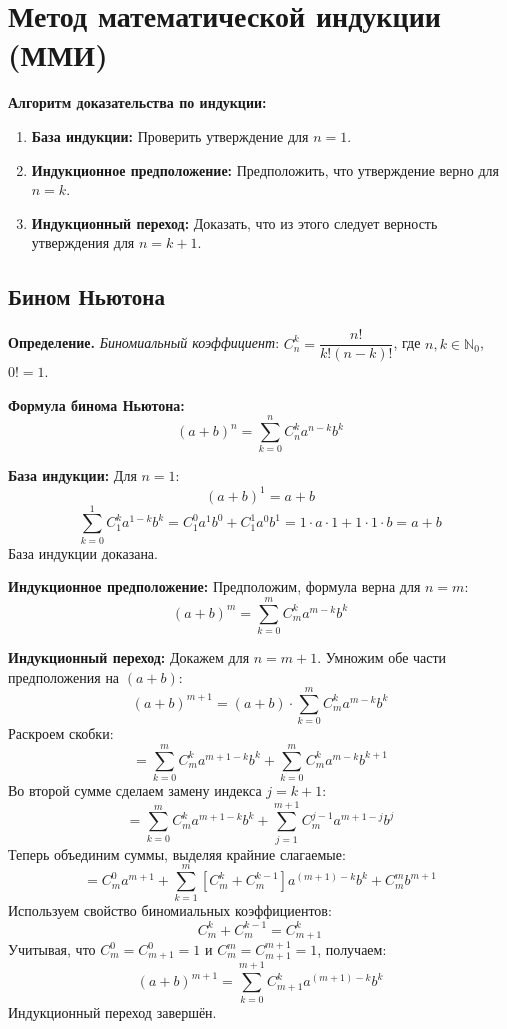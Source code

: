 \documentclass[12pt, a4paper]{article}
\begin{document}
\section{Метод математической индукции (ММИ)}
\begin{tcolorbox}
\textbf{Алгоритм доказательства по индукции:}
\begin{enumerate}
    \item \textbf{База индукции:} Проверить утверждение для $n = 1$.
    \item \textbf{Индукционное предположение:} Предположить, что утверждение верно для $n = k$.
    \item \textbf{Индукционный переход:} Доказать, что из этого следует верность утверждения для $n = k+1$.
\end{enumerate}
\end{tcolorbox}

\subsection{Бином Ньютона}
\begin{tcolorbox}
\textbf{Определение.} \textit{Биномиальный коэффициент}:
$C_n^k = \dfrac{n!}{k!(n-k)!}$, где $n,k \in \mathbb{N}_0$, $0! = 1$.
\end{tcolorbox}

\begin{tcolorbox}
\textbf{Формула бинома Ньютона:}
$$(a+b)^n = \sum_{k=0}^{n} C_n^k a^{n-k}b^k$$
\end{tcolorbox}

\begin{tcolorbox}[title=Доказательство по ММИ, breakable]
\textbf{База индукции:} Для $n=1$:
$$(a+b)^1 = a + b$$
$$\sum_{k=0}^{1} C_1^k a^{1-k}b^k = C_1^0 a^1 b^0 + C_1^1 a^0 b^1 = 1 \cdot a \cdot 1 + 1 \cdot 1 \cdot b = a + b$$
База индукции доказана.

\textbf{Индукционное предположение:} Предположим, формула верна для $n = m$:
$$(a+b)^m = \sum_{k=0}^{m} C_m^k a^{m-k}b^k$$

\textbf{Индукционный переход:} Докажем для $n = m+1$.
Умножим обе части предположения на $(a+b)$:
$$(a+b)^{m+1} = (a+b) \cdot \sum_{k=0}^{m} C_m^k a^{m-k}b^k$$
Раскроем скобки:
$$= \sum_{k=0}^{m} C_m^k a^{m+1-k}b^k + \sum_{k=0}^{m} C_m^k a^{m-k}b^{k+1}$$
Во второй сумме сделаем замену индекса $j = k+1$:
$$= \sum_{k=0}^{m} C_m^k a^{m+1-k}b^k + \sum_{j=1}^{m+1} C_m^{j-1} a^{m+1-j}b^{j}$$
Теперь объединим суммы, выделяя крайние слагаемые:
$$= C_m^0 a^{m+1} + \sum_{k=1}^{m} \left[ C_m^k + C_m^{k-1} \right] a^{(m+1)-k}b^k + C_m^m b^{m+1}$$
Используем свойство биномиальных коэффициентов:
$$C_m^k + C_m^{k-1} = C_{m+1}^k$$
Учитывая, что $C_m^0 = C_{m+1}^0 = 1$ и $C_m^m = C_{m+1}^{m+1} = 1$, получаем:
$$(a+b)^{m+1} = \sum_{k=0}^{m+1} C_{m+1}^k a^{(m+1)-k}b^k$$
Индукционный переход завершён.
\end{tcolorbox}
\end{document}
